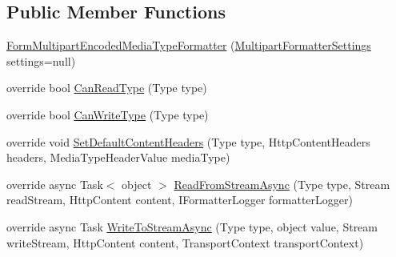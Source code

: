 \subsection*{Public Member Functions}
\begin{DoxyCompactItemize}
\item 
\hyperlink{classCqrs_1_1WebApi_1_1Formatters_1_1FormMultipart_1_1FormMultipartEncodedMediaTypeFormatter_a73f24dec1824edeaaa019bc0dfa1b2e2_a73f24dec1824edeaaa019bc0dfa1b2e2}{Form\+Multipart\+Encoded\+Media\+Type\+Formatter} (\hyperlink{classCqrs_1_1WebApi_1_1Formatters_1_1FormMultipart_1_1Infrastructure_1_1MultipartFormatterSettings}{Multipart\+Formatter\+Settings} settings=null)
\item 
override bool \hyperlink{classCqrs_1_1WebApi_1_1Formatters_1_1FormMultipart_1_1FormMultipartEncodedMediaTypeFormatter_a85006d7f413bbd7ceb2556b2ce68d402_a85006d7f413bbd7ceb2556b2ce68d402}{Can\+Read\+Type} (Type type)
\item 
override bool \hyperlink{classCqrs_1_1WebApi_1_1Formatters_1_1FormMultipart_1_1FormMultipartEncodedMediaTypeFormatter_a9fac23d803544c138f9e2fa75042a100_a9fac23d803544c138f9e2fa75042a100}{Can\+Write\+Type} (Type type)
\item 
override void \hyperlink{classCqrs_1_1WebApi_1_1Formatters_1_1FormMultipart_1_1FormMultipartEncodedMediaTypeFormatter_a181d1b06501e0eda8667c6a4b844400b_a181d1b06501e0eda8667c6a4b844400b}{Set\+Default\+Content\+Headers} (Type type, Http\+Content\+Headers headers, Media\+Type\+Header\+Value media\+Type)
\item 
override async Task$<$ object $>$ \hyperlink{classCqrs_1_1WebApi_1_1Formatters_1_1FormMultipart_1_1FormMultipartEncodedMediaTypeFormatter_a4599833b528ecb762d9d5d2c72b11d90_a4599833b528ecb762d9d5d2c72b11d90}{Read\+From\+Stream\+Async} (Type type, Stream read\+Stream, Http\+Content content, I\+Formatter\+Logger formatter\+Logger)
\item 
override async Task \hyperlink{classCqrs_1_1WebApi_1_1Formatters_1_1FormMultipart_1_1FormMultipartEncodedMediaTypeFormatter_aced660e9ab818558fc5728ec82e2434e_aced660e9ab818558fc5728ec82e2434e}{Write\+To\+Stream\+Async} (Type type, object value, Stream write\+Stream, Http\+Content content, Transport\+Context transport\+Context)
\end{DoxyCompactItemize}


